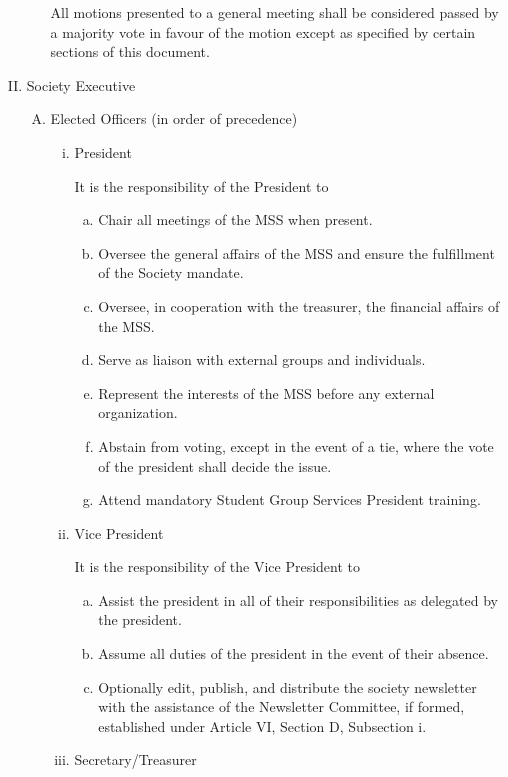 \documentclass[11pt]{article}
\begin{document}
\begin{enumerate}[I.]
\begin{enumerate}[A)]
      All motions presented to a general meeting shall be considered passed by
      a majority vote in favour of the motion except as specified by certain
      sections of this document. 
    \end{enumerate}
  \item Society Executive
    \begin{enumerate}[A)]
      \item Elected Officers (in order of precedence)
        \begin{enumerate}[i)]
          \item President
          
          It is the responsibility of the President to
            \begin{enumerate}[a)]
              \item Chair all meetings of the MSS when present. 
              \item  Oversee the general affairs of the MSS and ensure the
                fulfillment of the Society mandate. 
              \item Oversee, in cooperation with the treasurer, the financial
                affairs of the MSS. 
              \item Serve as liaison with external groups and individuals. 
              \item Represent the interests of the MSS before any external
                organization. 
              \item Abstain from voting, except in the event of a tie, where
                the vote of the president shall decide the issue.
              \item Attend mandatory Student Group Services President training.
          
            \end{enumerate}
          \item Vice President
          
          It is the responsibility of the Vice President to
            \begin{enumerate}[a)]
              \item Assist the president in all of their responsibilities as
                delegated by the president.
              \item Assume all duties of the president in the event of their
                absence. 
              \item Optionally edit, publish, and distribute the society
                newsletter with the assistance of the Newsletter Committee, if
                formed, established under Article VI, Section D, Subsection i.
            \end{enumerate}
          \item Secretary/Treasurer
          

\end{enumerate}
\end{enumerate}
\end{enumerate}
\end{document}
